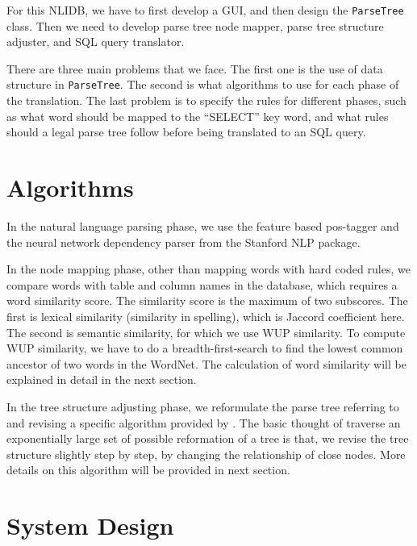 \documentclass[twocolumn]{article}
\begin{document}
For this NLIDB, we have to first develop a GUI, and then design the \texttt{ParseTree} class. Then we need to develop parse tree node mapper, parse tree structure adjuster, and SQL query translator.

There are three main problems that we face. The first one is the use of data structure in \texttt{ParseTree}. The second is what algorithms to use for each phase of the translation. The last problem is to specify the rules for different phases, such as what word should be mapped to the ``SELECT'' key word, and what rules should a legal parse tree follow before being translated to an SQL query.

\section{Algorithms}

In the natural language parsing phase, we use the feature based pos-tagger\cite{toutanova2003feature} and the neural network dependency parser\cite{chen2014fast} from the Stanford NLP package.

In the node mapping phase, other than mapping words with hard coded rules, we compare words with table and column names in the database, which requires a word similarity score. The similarity score is the maximum of two subscores. The first is lexical similarity (similarity in spelling), which is Jaccord coefficient here. The second is semantic similarity, for which we use WUP similarity\cite{wu1994verbs}. To compute WUP similarity, we have to do a breadth-first-search to find the lowest common ancestor of two words in the WordNet. The calculation of word similarity will be explained in detail in the next section.

In the tree structure adjusting phase, we reformulate the parse tree referring to and revising a specific algorithm provided by \cite{li2014}. The basic thought of traverse an exponentially large set of possible reformation of a tree is that, we revise the tree structure slightly step by step, by changing the relationship of close nodes. More details on this algorithm will be provided in next section.

\section{System Design}
\end{document}
